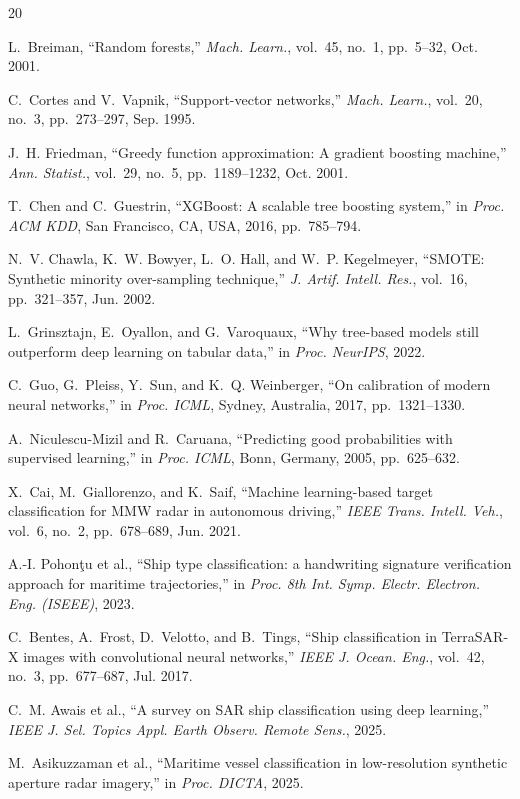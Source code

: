 \documentclass[journal]{IEEEtran}
\begin{document}

\begin{thebibliography}{20}

L.~Breiman, ``Random forests,'' \textit{Mach. Learn.}, vol.~45, no.~1, pp.~5--32, Oct. 2001.

C.~Cortes and V.~Vapnik, ``Support-vector networks,'' \textit{Mach. Learn.}, vol.~20, no.~3, pp.~273--297, Sep. 1995.

J.~H. Friedman, ``Greedy function approximation: A gradient boosting machine,'' \textit{Ann. Statist.}, vol.~29, no.~5, pp.~1189--1232, Oct. 2001.

T.~Chen and C.~Guestrin, ``XGBoost: A scalable tree boosting system,'' in \textit{Proc. ACM KDD}, San Francisco, CA, USA, 2016, pp.~785--794.

N.~V. Chawla, K.~W. Bowyer, L.~O. Hall, and W.~P. Kegelmeyer, ``SMOTE: Synthetic minority over-sampling technique,'' \textit{J. Artif. Intell. Res.}, vol.~16, pp.~321--357, Jun. 2002.

L.~Grinsztajn, E.~Oyallon, and G.~Varoquaux, ``Why tree-based models still outperform deep learning on tabular data,'' in \textit{Proc. NeurIPS}, 2022.

C.~Guo, G.~Pleiss, Y.~Sun, and K.~Q. Weinberger, ``On calibration of modern neural networks,'' in \textit{Proc. ICML}, Sydney, Australia, 2017, pp.~1321--1330.

A.~Niculescu-Mizil and R.~Caruana, ``Predicting good probabilities with supervised learning,'' in \textit{Proc. ICML}, Bonn, Germany, 2005, pp.~625--632.

X.~Cai, M.~Giallorenzo, and K.~Saif, ``Machine learning-based target classification for MMW radar in autonomous driving,'' \textit{IEEE Trans. Intell. Veh.}, vol.~6, no.~2, pp.~678--689, Jun. 2021.

A.-I. Pohon\c{t}u et al., ``Ship type classification: a handwriting signature verification approach for maritime trajectories,'' in \textit{Proc. 8th Int. Symp. Electr. Electron. Eng. (ISEEE)}, 2023.

C.~Bentes, A.~Frost, D.~Velotto, and B.~Tings, ``Ship classification in TerraSAR-X images with convolutional neural networks,'' \textit{IEEE J. Ocean. Eng.}, vol.~42, no.~3, pp.~677--687, Jul. 2017.

C.~M. Awais et al., ``A survey on SAR ship classification using deep learning,'' \textit{IEEE J. Sel. Topics Appl. Earth Observ. Remote Sens.}, 2025.

M.~Asikuzzaman et al., ``Maritime vessel classification in low-resolution synthetic aperture radar imagery,'' in \textit{Proc. DICTA}, 2025.

\end{thebibliography}
\end{document}

